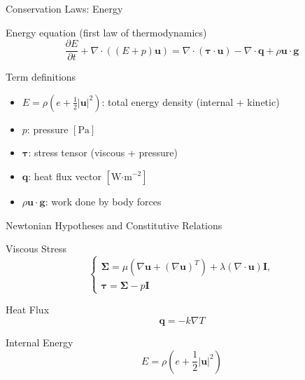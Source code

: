 \begin{secframe}
\small
\textcolor{red_unipd}{\Large Conservation Laws: Energy}

\vspace{0.8em}

\begin{alertblock}{Energy equation (first law of thermodynamics)}
\[
\dfrac{\partial E}{\partial t}
+ \nabla\!\cdot\!((E+p)\mathbf{u})
= \nabla\!\cdot\!(\boldsymbol{\tau}\!\cdot\!\mathbf{u})
- \nabla\!\cdot\!\mathbf{q}
+ \rho \mathbf{u}\!\cdot\!\mathbf{g}
\]
\end{alertblock}

\begin{block}{Term definitions}
\begin{itemize}
  \item \(E = \rho\!\left(e + \tfrac{1}{2}|\mathbf{u}|^2\right)\): total energy density (internal + kinetic)
  \item \(p\): pressure \([\text{Pa}]\)
  \item \(\boldsymbol{\tau}\): stress tensor (viscous + pressure)
  \item \(\mathbf{q}\): heat flux vector \([\text{W·m}^{-2}]\)
  \item \(\rho \mathbf{u}\!\cdot\!\mathbf{g}\): work done by body forces
\end{itemize}
\end{block}
\end{secframe}




\begin{secframe}
\small
\textcolor{red_unipd}{\Large Newtonian Hypotheses and Constitutive Relations}

\begin{alertblock}{Viscous Stress}
\[
\begin{cases}
\boldsymbol{\Sigma} = \mu\left(\nabla \mathbf{u} + (\nabla \mathbf{u})^T\right) + \lambda (\nabla\!\cdot\!\mathbf{u}) \mathbf{I},\\[4pt]
\boldsymbol{\tau} = \boldsymbol{\Sigma} - p \mathbf{I}
\end{cases}
\]
\end{alertblock}

\begin{alertblock}{Heat Flux}
\[
\mathbf{q} = -k \nabla T
\]
\end{alertblock}

\begin{alertblock}{Internal Energy}
\[
E = \rho\left(e + \dfrac{1}{2}|\mathbf{u}|^2\right)
\]
\end{alertblock}

\end{secframe}




